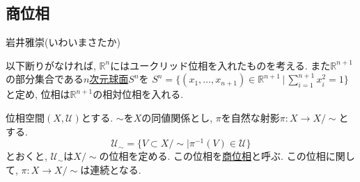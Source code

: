 \documentclass[dvipdfmx,a4paper,11pt]{article}
\newcommand{\R}{\mathbb{R}}
\theoremstyle{definition}
\begin{document}
\begin{enumerate}[ label=\textbf{問}\ref*{sec-product}.\arabic*]
 \end{enumerate}

\newpage




\begin{center}
\section{商位相}
\label{sec-quot}
\end{center}

\begin{flushright}
 岩井雅崇(いわいまさたか)
\end{flushright}


以下断りがなければ, $\R^{n}$にはユークリッド位相を入れたものを考える. また$\R^{n+1}$の部分集合である\underline{$n$次元球面}$S^n$を
$S^n = \{ (x_1, \ldots, x_{n+1}) \in \R^{n+1} \, |\,\sum_{i=1}^{n+1} x_{i}^{2} =1\}$
と定め, 位相は$\R^{n+1}$の相対位相を入れる. 
  \begin{tcolorbox}[
   colback = white,
   colframe = green!35!black,
    fonttitle = \bfseries,
    breakable = true]
位相空間$(X, \mathscr{U})$とする.  $\sim$を$X$の同値関係とし, $\pi$を自然な射影$\pi : X\to X/\sim $とする. 
$$
\mathscr{U}_{\sim}= \{V \subset  X/\sim | \pi^{-1}(V) \in \mathscr{U}\}
$$
とおくと, $\mathscr{U}_{\sim}$は$X/\sim$の位相を定める. この位相を\underline{商位相}と呼ぶ. 
この位相に関して, $\pi : X\to X/\sim $は連続となる. 
 \end{tcolorbox}
\end{document}
